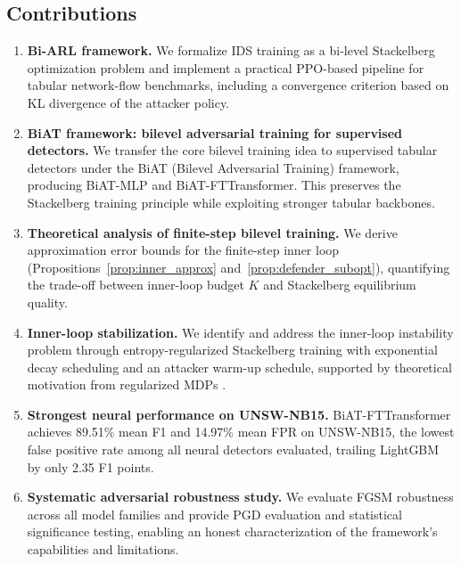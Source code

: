 \subsection{Contributions}

\begin{enumerate}
    \item \textbf{Bi-ARL framework.} We formalize IDS training as a bi-level Stackelberg optimization problem and implement a practical PPO-based pipeline for tabular network-flow benchmarks, including a convergence criterion based on KL divergence of the attacker policy.

    \item \textbf{BiAT framework: bilevel adversarial training for supervised detectors.} We transfer the core bilevel training idea to supervised tabular detectors under the BiAT (Bilevel Adversarial Training) framework, producing BiAT-MLP and BiAT-FTTransformer. This preserves the Stackelberg training principle while exploiting stronger tabular backbones.

    \item \textbf{Theoretical analysis of finite-step bilevel training.} We derive approximation error bounds for the finite-step inner loop (Propositions~\ref{prop:inner_approx} and~\ref{prop:defender_subopt}), quantifying the trade-off between inner-loop budget $K$ and Stackelberg equilibrium quality.

    \item \textbf{Inner-loop stabilization.} We identify and address the inner-loop instability problem through entropy-regularized Stackelberg training with exponential decay scheduling and an attacker warm-up schedule, supported by theoretical motivation from regularized MDPs \cite{geist2019entropy}.

    \item \textbf{Strongest neural performance on UNSW-NB15.} BiAT-FTTransformer achieves 89.51\% mean F1 and 14.97\% mean FPR on UNSW-NB15, the lowest false positive rate among all neural detectors evaluated, trailing LightGBM by only 2.35 F1 points.

    \item \textbf{Systematic adversarial robustness study.} We evaluate FGSM robustness across all model families and provide PGD evaluation and statistical significance testing, enabling an honest characterization of the framework's capabilities and limitations.
\end{enumerate}
